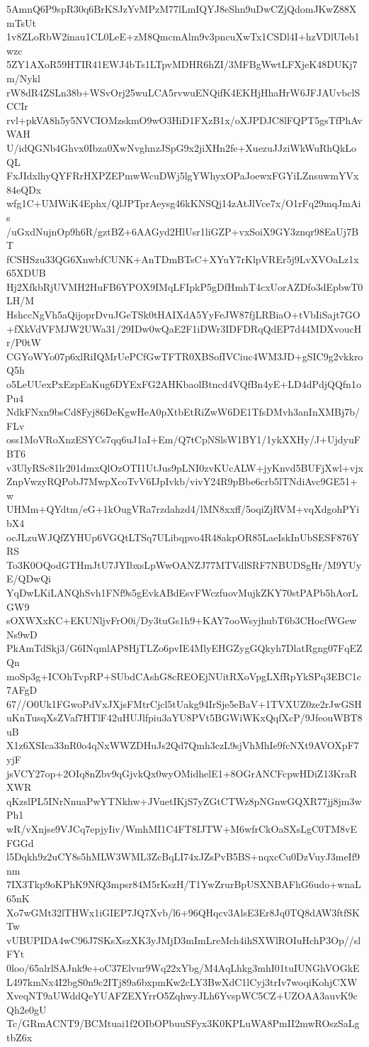 5AmnQ6P9spR30q6BrKSJzYvMPzM77lLmIQYJ8eShn9uDwCZjQdomJKwZ88XmTsUt
1v8ZLoRbW2inau1CL0LeE+zM8QmcmAlm9v3pncuXwTx1CSDl4I+hzVDlUIeb1wzc
5ZY1AXoR59HTIR41EWJ4bTs1LTpvMDHR6hZI/3MFBgWwtLFXjeK48DUKj7m/Nykl
rW8dR4ZSLn38b+WSvOrj25wuLCA5rvwuENQifK4EKHjHhaHrW6JFJAUvbclSCCIr
rvl+pkVA8h5y5NVCIOMzskmO9wO3HiD1FXzB1x/oXJPDJC8lFQPT5gsTfPhAvWAH
U/idQGNb4Ghvx0Ibza0XwNvghnzJSpG9x2jiXHn2fe+XuezuJJziWkWuRhQkLoQL
FxJIdxlhyQYFRrHXPZEPmwWcuDWj5lgYWhyxOPaJoewxFGYiLZnsuwmYVx84eQDx
wfg1C+UMWiK4Ephx/QlJPTprAeysg46kKNSQj14zAtJlVce7x/O1rFq29mqJmAis
/uGxdNujnOp9h6R/gztBZ+6AAGyd2HlUsr1liGZP+vxSoiX9GY3znqr98EaUj7BT
fCSHSzu33QG6XnwbfCUNK+AnTDmBTsC+XYuY7rKlpVREr5j9LvXVOaLz1x65XDUB
Hj2XfkbRjUVMH2HuFB6YPOX9IMqLFIpkP5gDfHmhT4cxUorAZDfo3dEpbwT0LH/M
HshccNgVh5aQijoprDvuJGeTSk0tHAIXdA5YyFeJW87fjLRBiaO+tVbIiSajt7GO
+fXkVdVFMJW2UWa31/29IDw0wQaE2F1iDWr3IDFDRqQdEP7d44MDXvoucHr/P0tW
CGYoWYo07p6xlRiIQMrUePCfGwTFTR0XBSofIVCiuc4WM3JD+gSIC9g2vkkroQ5h
o5LeUUexPxEzpEaKug6DYExFG2AHKbaolBtncd4VQfBn4yE+LD4dPdjQQfn1oPu4
NdkFNxn9bsCd8Fyj86DeKgwHeA0pXtbEtRiZwW6DE1TfsDMvh3anInXMBj7b/FLv
oss1MoVRoXnzESYCs7qq6uJ1aI+Em/Q7tCpNSlsW1BY1/1ykXXHy/J+UjdyuFBT6
v3UlyRSc81lr201dmxQlOzOTI1UtJus9pLNI0zvKUcALW+jyKnvd5BUFjXwl+vjx
ZnpVwzyRQPobJ7MwpXcoTvV6IJpIvkb/vivY24R9pBbe6crb5lTNdiAvc9GE51+w
UHMm+QYdtm/eG+1kOugVRa7rzdahzd4/lMN8xxff/5oqiZjRVM+vqXdgohPYibX4
ocJLzuWJQfZYHUp6VGQtLTSq7ULibqpvo4R48akpOR85LaeIskInUbSESF876YRS
To3K0OQodGTHmJtU7JYIbxsLpWwOANZJ77MTVdlSRF7NBUDSgHr/M9YUyE/QDwQi
YqDwLKiLANQhSvh1FNf9s5gEvkABdEsvFWczfuovMujkZKY70stPAPb5hAorLGW9
sOXWXxKC+EKUNljvFrO0i/Dy3tuGs1h9+KAY7ooWsyjhubT6b3CHocfWGewNs9wD
PkAmTdSkj3/G6INqmlAP8HjTLZo6pvIE4MlyEHGZygGQkyh7DlatRgng07FqEZQn
moSp3g+ICOhTvpRP+SUbdCAshG8cREOEjNUitRXoVpgLXfRpYkSPq3EBC1c7AFgD
67//O0Uk1FGwoPdVxJXjsFMtrCjcl5tUakg94IrSje5eBaV+1TVXUZ0ze2rJwGSH
uKnTusqXsZVaf7HTlF42uHUJlfpiu3aYU8PVt5BGWiWKxQqfXcP/9JfeouWBT8uB
X1z6XSIca33nR0o4qNxWWZDHuJs2Qd7Qmh3czL9sjVhMhIe9fcNXt9AVOXpF7yjF
jsVCY27op+2OIq8nZbv9qGjvkQx0wyOMidhelE1+8OGrANCFcpwHDiZ13KraRXWR
qKzslPL5INrNnuaPwYTNkhw+JVuetIKjS7yZGtCTWz8pNGnwGQXR77jj8jm3wPh1
wR/vXnjse9VJCq7epjyIiv/WmhMI1C4FT8IJTW+M6wfrCkOaSXsLgC0TM8vEFGGd
l5Dqkh9z2uCY8s5hMLW3WML3ZcBqLI74xJZsPvB5BS+nqxcCu0DzVuyJ3meIf9nm
7IX3Tkp9oKPhK9NfQ3mpsr84M5rKszH/T1YwZrurBpUSXNBAFhG6udo+wnaL65nK
Xo7wGMt32lTHWx1iGIEP7JQ7Xvb/l6+96QHqcv3AlsE3Er8Jq0TQ8dAW3ftfSKTw
vUBUPIDA4wC96J7SKsXszXK3yJMjD3mImLreMch4ihSXWlROIuHchP3Op//slFYt
0loo/65alrlSAJnk9e+oC37Elvur9Wq22xYbg/M4AqLhkg3mhI01tuIUNGhVOGkE
L497kmNx4I2bgS0n9c2ITj89a6bxpmKw2cLY3BwXdC1lCyj3trIv7woqiKohjCXW
XveqNT9aUWddQeYUAFZEXYrrO5ZqhwyJLh6YvspWC5CZ+UZOAA3auvK9cQh2e0gU
Tc/GRmACNT9/BCMtuai1f2OIbOPbuuSFyx3K0KPLuWA8PmII2mwROszSaLgtbZ6x
